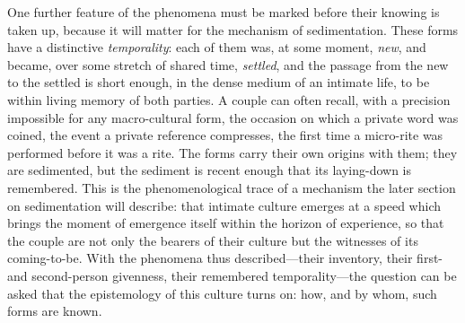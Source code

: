 One further feature of the phenomena must be marked before their knowing is taken up, because it will matter for the mechanism of sedimentation. These forms have a distinctive \emph{temporality}: each of them was, at some moment, \emph{new}, and became, over some stretch of shared time, \emph{settled}, and the passage from the new to the settled is short enough, in the dense medium of an intimate life, to be within living memory of both parties. A couple can often recall, with a precision impossible for any macro-cultural form, the occasion on which a private word was coined, the event a private reference compresses, the first time a micro-rite was performed before it was a rite. The forms carry their own origins with them; they are sedimented, but the sediment is recent enough that its laying-down is remembered. This is the phenomenological trace of a mechanism the later section on sedimentation will describe: that intimate culture emerges at a speed which brings the moment of emergence itself within the horizon of experience, so that the couple are not only the bearers of their culture but the witnesses of its coming-to-be. With the phenomena thus described---their inventory, their first- and second-person givenness, their remembered temporality---the question can be asked that the epistemology of this culture turns on: how, and by whom, such forms are known.
